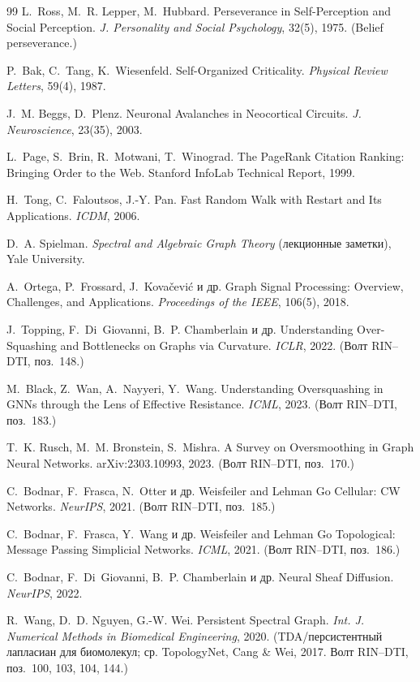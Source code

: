 \begin{thebibliography}{99}
 L.~Ross, M.~R. Lepper, M.~Hubbard.
Perseverance in Self-Perception and Social Perception.
\emph{J. Personality and Social Psychology}, 32(5), 1975. (Belief perseverance.)

 P.~Bak, C.~Tang, K.~Wiesenfeld.
Self-Organized Criticality. \emph{Physical Review Letters}, 59(4), 1987.

 J.~M. Beggs, D.~Plenz.
Neuronal Avalanches in Neocortical Circuits. \emph{J. Neuroscience}, 23(35), 2003.

 L.~Page, S.~Brin, R.~Motwani, T.~Winograd.
The PageRank Citation Ranking: Bringing Order to the Web.
Stanford InfoLab Technical Report, 1999.

 H.~Tong, C.~Faloutsos, J.-Y. Pan.
Fast Random Walk with Restart and Its Applications. \emph{ICDM}, 2006.

 D.~A. Spielman.
\emph{Spectral and Algebraic Graph Theory} (лекционные заметки), Yale University.

 A.~Ortega, P.~Frossard, J.~Kova\v{c}evi\'c и др.
Graph Signal Processing: Overview, Challenges, and Applications.
\emph{Proceedings of the IEEE}, 106(5), 2018.

 J.~Topping, F.~Di~Giovanni, B.~P. Chamberlain и др.
Understanding Over-Squashing and Bottlenecks on Graphs via Curvature.
\emph{ICLR}, 2022. (Волт RIN–DTI, поз.~148.)

 M.~Black, Z.~Wan, A.~Nayyeri, Y.~Wang.
Understanding Oversquashing in GNNs through the Lens of Effective Resistance.
\emph{ICML}, 2023. (Волт RIN–DTI, поз.~183.)

 T.~K. Rusch, M.~M. Bronstein, S.~Mishra.
A Survey on Oversmoothing in Graph Neural Networks. arXiv:2303.10993, 2023.
(Волт RIN–DTI, поз.~170.)

 C.~Bodnar, F.~Frasca, N.~Otter и др.
Weisfeiler and Lehman Go Cellular: CW Networks. \emph{NeurIPS}, 2021.
(Волт RIN–DTI, поз.~185.)

 C.~Bodnar, F.~Frasca, Y.~Wang и др.
Weisfeiler and Lehman Go Topological: Message Passing Simplicial Networks.
\emph{ICML}, 2021. (Волт RIN–DTI, поз.~186.)

 C.~Bodnar, F.~Di~Giovanni, B.~P. Chamberlain и др.
Neural Sheaf Diffusion. \emph{NeurIPS}, 2022.

 R.~Wang, D.~D. Nguyen, G.-W. Wei.
Persistent Spectral Graph. \emph{Int. J. Numerical Methods in Biomedical
Engineering}, 2020. (TDA/персистентный лапласиан для биомолекул; ср. TopologyNet,
Cang \& Wei, 2017. Волт RIN–DTI, поз.~100, 103, 104, 144.)


\end{thebibliography}
